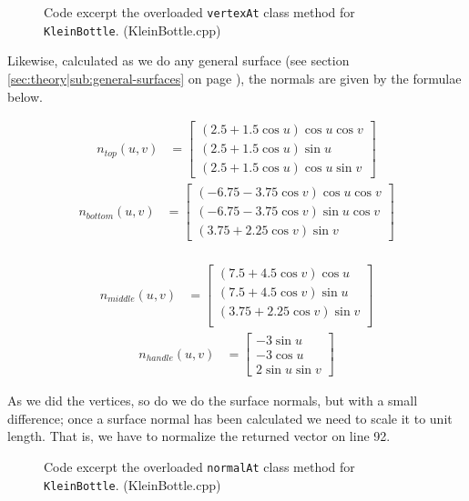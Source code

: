 \documentclass[11pt]{article}
\newcommand{\secref}[1]{see section \ref{#1} on page \pageref{#1}}
\newcommand{\code}[1]{{\tt #1}}
\newcommand{\codefig}[5]
{
\begin{figure}[H]
    
    \caption{Code excerpt #5 (#2)}
    \label{code:#1}
\end{figure}
}
\begin{document}
\codefig{klein-bottle-vtx}{KleinBottle.cpp}{27}{59}
{the overloaded \code{vertexAt} class method for \code{KleinBottle}.}

Likewise, calculated as we do any general surface
(\secref{sec:theory|sub:general-surfaces}), the normals are given by the
formulae below.
\vspace{-0.25in}
\begin{multicols}{2}
    \begin{align*}
        n_{top}(u,v) &=
        \begin{bmatrix}
            (2.5 + 1.5 \cos u) \cos u \cos v \\
            (2.5 + 1.5 \cos u) \sin u \\
            (2.5 + 1.5 \cos u) \cos u \sin v
        \end{bmatrix}
    \end{align*}
    \begin{align*}
        n_{bottom}(u,v) &=
        \begin{bmatrix}
            (-6.75 - 3.75 \cos v) \cos u \cos v \\
            (-6.75 - 3.75 \cos v) \sin u \cos v \\
            (3.75 + 2.25 \cos v) \sin v
        \end{bmatrix}
    \end{align*}
    \vfill\columnbreak
    {\ }\vspace{-0.25in}
    \begin{align*}
        n_{middle}(u,v) &=
        \begin{bmatrix}
            (7.5 + 4.5 \cos v) \cos u \\
            (7.5 + 4.5 \cos v) \sin u \\
            (3.75 + 2.25 \cos v) \sin v \\
        \end{bmatrix}
    \end{align*}
    \vspace{-0.5in}
    \begin{align*}
        n_{handle}(u,v) &=
        \begin{bmatrix}
            -3 \sin u \\
            -3 \cos u \\
             2 \sin u \sin v
        \end{bmatrix}
    \end{align*}
    \vfill
\end{multicols}

As we did the vertices, so do we do the surface normals, but with a small
difference; once a surface normal has been calculated we need to scale it to
unit length. That is, we have to normalize the returned vector on line 92.
\codefig{klein-bottle-nml}{KleinBottle.cpp}{61}{93}
{the overloaded \code{normalAt} class method for \code{KleinBottle}.}
\end{document}
